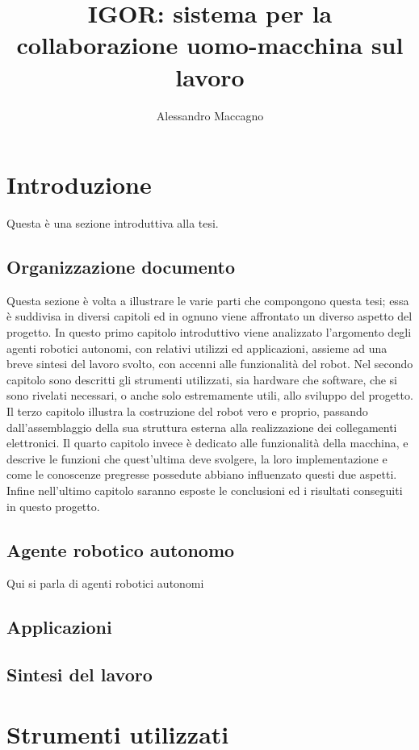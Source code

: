 \documentclass[Lau]{sapthesis}
\title{IGOR: sistema per la collaborazione uomo-macchina sul lavoro}
\author{Alessandro Maccagno}
\begin{document}
\frontmatter
\maketitle

\tableofcontents
\newpage

\mainmatter
\chapter{Introduzione}
Questa è una sezione introduttiva alla tesi.
\section{Organizzazione documento}
Questa sezione è volta a illustrare le varie parti che compongono questa tesi; essa è suddivisa in diversi capitoli ed in ognuno viene affrontato un diverso aspetto del progetto. In questo primo capitolo introduttivo viene analizzato l'argomento degli agenti robotici autonomi, con relativi utilizzi ed applicazioni, assieme ad una breve sintesi del lavoro svolto, con accenni alle funzionalità del robot. Nel secondo capitolo sono descritti gli strumenti utilizzati, sia hardware che software, che si sono rivelati necessari, o anche solo estremamente utili, allo sviluppo del progetto. Il terzo capitolo illustra la costruzione del robot vero e proprio, passando dall'assemblaggio della sua struttura esterna alla realizzazione dei collegamenti elettronici. Il quarto capitolo invece è dedicato alle funzionalità della macchina, e descrive le funzioni che quest'ultima deve svolgere, la loro implementazione e come le conoscenze pregresse possedute abbiano influenzato questi due aspetti. Infine nell'ultimo capitolo saranno esposte le conclusioni ed i risultati conseguiti in questo progetto.
\section{Agente robotico autonomo}
Qui si parla di agenti robotici autonomi
\section{Applicazioni}
\section{Sintesi del lavoro}
\chapter{Strumenti utilizzati}
\end{document}
